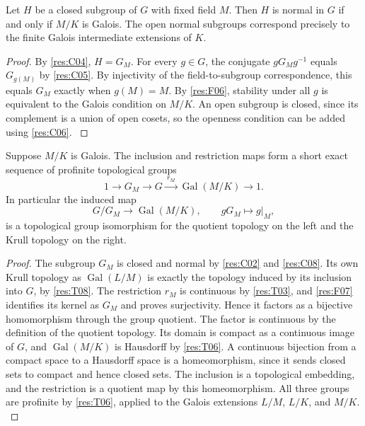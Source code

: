 \begin{corollary}
\label{res:C08}
Let \(H\) be a closed subgroup of \(G\) with fixed field \(M\).
Then \(H\) is normal in \(G\) if and only if \(M/K\) is Galois.
The open normal subgroups correspond precisely to the finite
Galois intermediate extensions of \(K\).
\end{corollary}

\begin{proof}
By \ref{res:C04}, \(H=G_M\). For every \(g\in G\), the conjugate
\(gG_Mg^{-1}\) equals \(G_{g(M)}\) by \ref{res:C05}.
By injectivity of the field-to-subgroup correspondence,
this equals \(G_M\) exactly when \(g(M)=M\). By \ref{res:F06},
stability under all \(g\) is equivalent to the Galois condition
on \(M/K\). An open subgroup is closed, since its complement is a
union of open cosets, so the openness condition can be added
using \ref{res:C06}.
\cite[Theorem 7.13(c)--(d)]{milne}
\cite[Tag 0BML]{stacks}
\end{proof}

\begin{theorem}
\label{res:C09}
Suppose \(M/K\) is Galois. The inclusion and restriction maps form
a short exact sequence of profinite topological groups
\[
  1\longrightarrow G_M\longrightarrow G
   \xrightarrow{\ r_M\ }\operatorname{Gal}(M/K)
   \longrightarrow 1 .
\]
In particular the induced map
\[
    G/G_M \longrightarrow \operatorname{Gal}(M/K),
    \qquad gG_M\longmapsto g|_M ,
\]
is a topological group isomorphism for the quotient topology on
the left and the Krull topology on the right.
\end{theorem}

\begin{proof}
The subgroup \(G_M\) is closed and normal by \ref{res:C02}
and \ref{res:C08}. Its own Krull topology as \(\operatorname{Gal}(L/M)\)
is exactly the topology induced by its inclusion into \(G\), by
\ref{res:T08}. The restriction \(r_M\) is continuous by \ref{res:T03},
and \ref{res:F07} identifies its kernel as \(G_M\) and proves
surjectivity. Hence it factors as a bijective homomorphism through
the group quotient. The factor is continuous by the definition
of the quotient topology. Its domain is compact as a continuous
image of \(G\), and \(\operatorname{Gal}(M/K)\) is Hausdorff by
\ref{res:T06}. A continuous bijection from a compact space to
a Hausdorff space is a homeomorphism, since it sends closed sets
to compact and hence closed sets. The inclusion is a topological
embedding, and the restriction is a quotient map by this homeomorphism.
All three groups are profinite by \ref{res:T06}, applied to
the Galois extensions \(L/M\), \(L/K\), and \(M/K\).
\cite[Theorem 7.13(d)]{milne}
\cite[Theorem 2.11.3]{rz}
\cite[Tag 0BMM]{stacks}
\end{proof}

